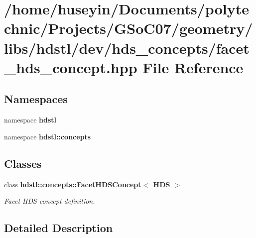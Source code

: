 \section{/home/huseyin/Documents/polytechnic/Projects/GSo\-C07/geometry/libs/hdstl/dev/hds\_\-concepts/facet\_\-hds\_\-concept.hpp File Reference}
\label{facet__hds__concept_8hpp}
\subsection*{Namespaces}
\begin{CompactItemize}
\item 
namespace \textbf{hdstl}
\item 
namespace \textbf{hdstl::concepts}
\end{CompactItemize}
\subsection*{Classes}
\begin{CompactItemize}
\item 
class \bf{hdstl::concepts::Facet\-HDSConcept$<$ HDS $>$}
\begin{CompactList}\small\item\em Facet HDS concept definition. \item\end{CompactList}\end{CompactItemize}


\subsection{Detailed Description}
